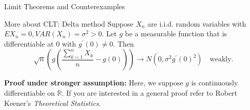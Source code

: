 \documentclass [aspectratio=169]{beamer}
\begin{document}
\begin{frame}{Limit Theorems and Counterexamples}
    \begin{block}{More about CLT: Delta method}
    Suppose $X_n$ are i.i.d. random variables with $EX_n=0, VAR(X_n) = \sigma^2 >0$. Let $g$ be a measurable function that is differentiable at $0$ with $g^\prime(0) \neq 0$. Then
    \[
    \sqrt{n}\left(g\left(\frac{\sum_{k=1}^nX_k}{n} - g(0) \right)\right) \to N(0, \sigma^2g^\prime(0)^2) \quad \text{weakly.}
    \] 
    \end{block}
    \textbf{Proof under stronger assumption: } Here, we suppose $g$ is continuously differentiable on $\mathbb{R}$. If you are interested in a general proof refer to Robert Keener's \textit{Theoretical Statistics}.
    \vspace{1.8in}
\end{frame}
\end{document}
